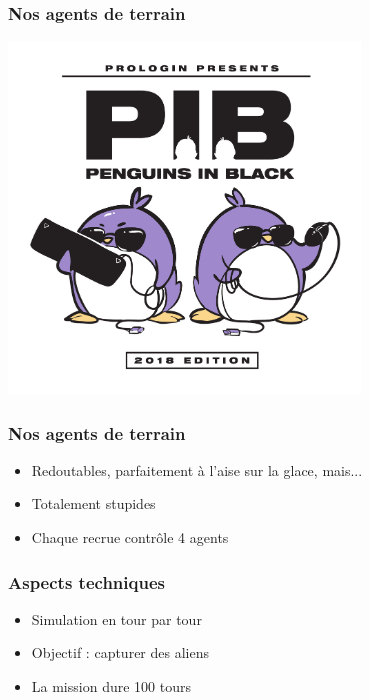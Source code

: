 \documentclass{beamer}
\begin{document}
\begin{frame}
    \frametitle{Nos agents de terrain}
    \begin{center}
        \includegraphics[width=0.7\textwidth]{../logofinale_inv}
    \end{center}
\end{frame}

\begin{frame}
    \frametitle{Nos agents de terrain}
    \begin{itemize}[<+->]
        \item Redoutables, parfaitement à l'aise sur la glace, mais...
        \item Totalement stupides
        \item Chaque recrue contrôle 4 agents
    \end{itemize}
\end{frame}


\begin{frame}
    \frametitle{Aspects techniques}
    \begin{itemize}
        \item Simulation en tour par tour
        \item Objectif : capturer des aliens
        \item La mission dure 100 tours
    \end{itemize}
\end{frame}
\end{document}
